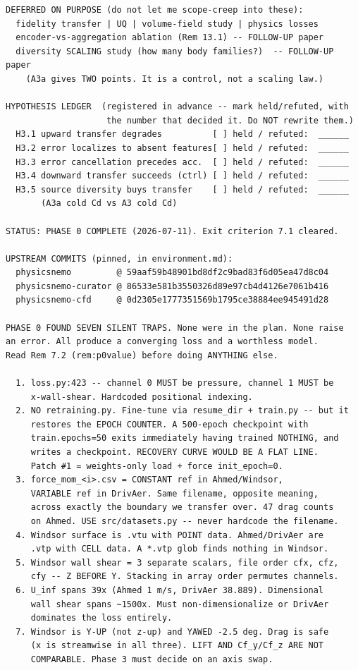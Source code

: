 \documentclass[10pt,a4paper]{article}
\theoremstyle{definition}
\begin{document}
\begin{lstlisting}[style=sh]
DEFERRED ON PURPOSE (do not let me scope-creep into these):
  fidelity transfer | UQ | volume-field study | physics losses
  encoder-vs-aggregation ablation (Rem 13.1) -- FOLLOW-UP paper
  diversity SCALING study (how many body families?)  -- FOLLOW-UP paper
    (A3a gives TWO points. It is a control, not a scaling law.)

HYPOTHESIS LEDGER  (registered in advance -- mark held/refuted, with
                    the number that decided it. Do NOT rewrite them.)
  H3.1 upward transfer degrades          [ ] held / refuted:  ______
  H3.2 error localizes to absent features[ ] held / refuted:  ______
  H3.3 error cancellation precedes acc.  [ ] held / refuted:  ______
  H3.4 downward transfer succeeds (ctrl) [ ] held / refuted:  ______
  H3.5 source diversity buys transfer    [ ] held / refuted:  ______
       (A3a cold Cd vs A3 cold Cd)

STATUS: PHASE 0 COMPLETE (2026-07-11). Exit criterion 7.1 cleared.

UPSTREAM COMMITS (pinned, in environment.md):
  physicsnemo         @ 59aaf59b48901bd8df2c9bad83f6d05ea47d8c04
  physicsnemo-curator @ 86533e581b3550326d89e97cb4d4126e7061b416
  physicsnemo-cfd     @ 0d2305e1777351569b1795ce38884ee945491d28

PHASE 0 FOUND SEVEN SILENT TRAPS. None were in the plan. None raise
an error. All produce a converging loss and a worthless model.
Read Rem 7.2 (rem:p0value) before doing ANYTHING else.

  1. loss.py:423 -- channel 0 MUST be pressure, channel 1 MUST be
     x-wall-shear. Hardcoded positional indexing.
  2. NO retraining.py. Fine-tune via resume_dir + train.py -- but it
     restores the EPOCH COUNTER. A 500-epoch checkpoint with
     train.epochs=50 exits immediately having trained NOTHING, and
     writes a checkpoint. RECOVERY CURVE WOULD BE A FLAT LINE.
     Patch #1 = weights-only load + force init_epoch=0.
  3. force_mom_<i>.csv = CONSTANT ref in Ahmed/Windsor,
     VARIABLE ref in DrivAer. Same filename, opposite meaning,
     across exactly the boundary we transfer over. 47 drag counts
     on Ahmed. USE src/datasets.py -- never hardcode the filename.
  4. Windsor surface is .vtu with POINT data. Ahmed/DrivAer are
     .vtp with CELL data. A *.vtp glob finds nothing in Windsor.
  5. Windsor wall shear = 3 separate scalars, file order cfx, cfz,
     cfy -- Z BEFORE Y. Stacking in array order permutes channels.
  6. U_inf spans 39x (Ahmed 1 m/s, DrivAer 38.889). Dimensional
     wall shear spans ~1500x. Must non-dimensionalize or DrivAer
     dominates the loss entirely.
  7. Windsor is Y-UP (not z-up) and YAWED -2.5 deg. Drag is safe
     (x is streamwise in all three). LIFT AND Cf_y/Cf_z ARE NOT
     COMPARABLE. Phase 3 must decide on an axis swap.


\end{lstlisting}
\end{document}
